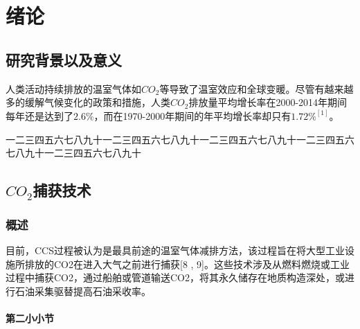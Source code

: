 \chapter{绪\quad 论}

\section{研究背景以及意义}

人类活动持续排放的温室气体如$CO_2$等导致了温室效应和全球变暖。尽管有越来越多的缓解气候变化的政策和措施，人类$CO_2$排放量平均增长率在2000-2014年期间每年还是达到了$2.6{\%}$，而在1970-2000年期间的年平均增长率却只有$1.72{\%}^{[1]}$。

一二三四五六七八九十一二三四五六七八九十一二三四五六七八九十一二三四五六七八九十一二三四五六七八九十

\section{$CO_2$捕获技术}

\subsection{概述}

目前，CCS过程被认为是最具前途的温室气体减排方法，该过程旨在将大型工业设施所排放的CO2在进入大气之前进行捕获[8 , 9]。这些技术涉及从燃料燃烧或工业过程中捕获CO2，通过船舶或管道输送CO2，将其永久储存在地质构造深处，或进行石油采集驱替提高石油采收率。

\subsubsection{第二小小节}
